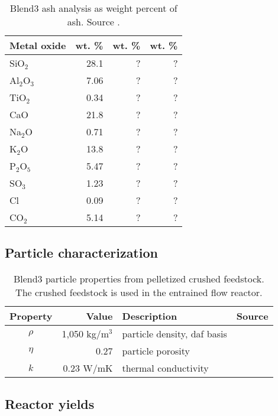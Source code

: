 \begin{table}[H]
    \centering
    \caption{Blend3 ash analysis as weight percent of ash. Source \cite{Choratch-2017}.}
    \begin{tabular}{lrrr}
        \toprule
        Metal oxide & wt. \% & wt. \% & wt. \% \\
        \midrule
        SiO$_2$     & 28.1 & ? & ? \\
        Al$_2$O$_3$ & 7.06 & ? & ? \\
        TiO$_2$     & 0.34 & ? & ? \\
        CaO         & 21.8 & ? & ? \\
        Na$_2$O     & 0.71 & ? & ? \\
        K$_2$O      & 13.8 & ? & ? \\
        P$_2$O$_5$  & 5.47 & ? & ? \\
        SO$_3$      & 1.23 & ? & ? \\
        Cl          & 0.09 & ? & ? \\
        CO$_2$      & 5.14 & ? & ? \\
        \bottomrule
    \end{tabular}
\end{table}

\subsection{Particle characterization}

\begin{table}[H]
    \centering
    \caption{Blend3 particle properties from pelletized crushed feedstock. The crushed feedstock is used in the entrained flow reactor.}
    \begin{tabular}{crlc}
        \toprule
        Property & Value & Description & Source \\
        \midrule
        $\rho$  & 1,050 kg/m$^3$ & particle density, daf basis & \cite{Pecha-2018} \\
        $\eta$  & 0.27           & particle porosity & \\
        $k$     & 0.23 W/mK      & thermal conductivity & \\
        \bottomrule
    \end{tabular}
\end{table}

\subsection{Reactor yields}

